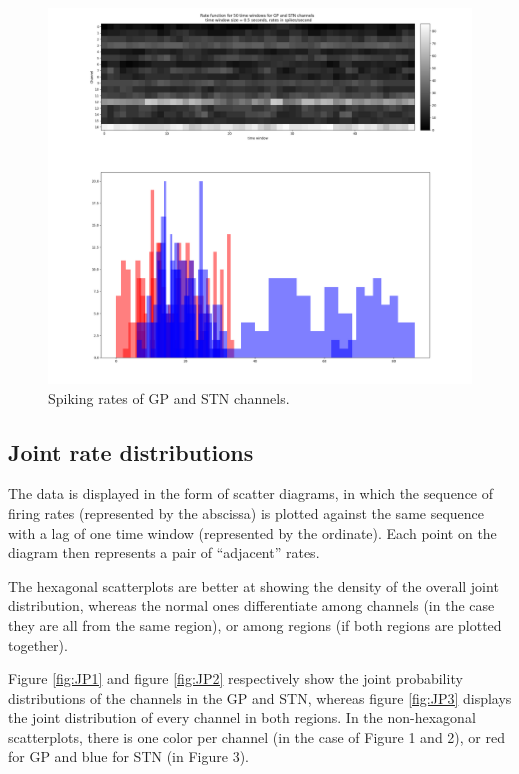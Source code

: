 \documentclass{kththesis}
\begin{document}
\begin{figure}[H]
    \centering
    \centerline{\includegraphics[width=1\textwidth]{images/spiking/SR_all.png}}
    \caption{Spiking rates of GP and STN channels.}
    \label{fig:ratesBoth1}
\end{figure}

\subsection{Joint rate distributions}

The data is displayed in the form of scatter diagrams, in which the sequence of firing rates (represented by the abscissa) is plotted against the same sequence with a lag of one time window (represented by the ordinate). 
Each point on the diagram then represents a pair of “adjacent” rates.

The hexagonal scatterplots are better at showing the density of the overall joint distribution, whereas the normal ones differentiate among channels (in the case they are all from the same region), or among regions (if both regions are plotted together).

Figure \ref{fig:JP1} and figure \ref{fig:JP2} respectively show the joint probability distributions of the channels in the GP and STN, whereas figure \ref{fig:JP3} displays the joint distribution of every channel in both regions. 
In the non-hexagonal scatterplots, there is one color per channel (in the case of Figure 1 and 2), or red for GP and blue for STN (in Figure 3).
\end{document}
